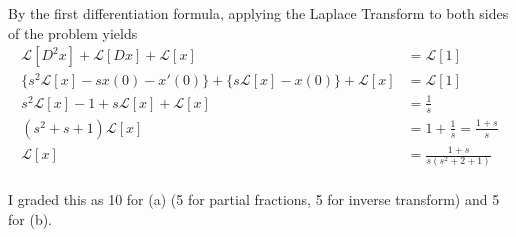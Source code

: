 \documentclass[11pt]{amsart}
\newcommand{\Lap}[1]{\ensuremath{{\mathcal{L}}\left[#1\right]}}
\begin{document}
By the first differentiation formula, applying the Laplace Transform
to both sides of the problem yields
\begin{align*}
	\Lap{D^{2}x}+\Lap{Dx}+\Lap{x}&=\Lap{1}\\
	\lbrace s^{2}\Lap{x}-s x(0)-x'(0)\rbrace
		+\lbrace s\Lap{x}-x(0)\rbrace+\Lap{x}
		&=\Lap{1}\\	
	s^{2}\Lap{x}-1
		+s\Lap{x}+\Lap{x}
		&=\frac{1}{s}\\
	(s^{2}+s+1)\Lap{x}&=1+\frac{1}{s}=\frac{1+s}{s}\\
	\Lap{x}&=\frac{1+s}{s(s^{2}+2+1)}	
\end{align*}
\\
I graded this as 10 for (a) (5 for partial fractions, 5 for inverse transform) and 5 for (b).
\end{document}
